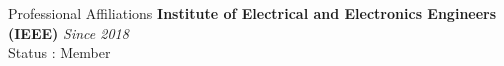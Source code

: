 \documentclass[
11pt, %
]{./assets/resume} %
\begin{document}
\begin{rSection}{Professional Affiliations}
	\textbf{Institute of Electrical and Electronics Engineers (IEEE)} \hfill \textit{Since 2018}\\
	Status : Member
	
\end{rSection}













\end{document}
